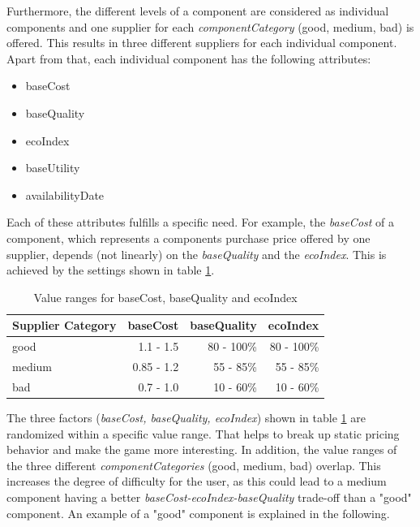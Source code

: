 Furthermore, the different levels of a component are considered as individual components and one supplier for each \textit{componentCategory} (good, medium, bad) is offered. This results in three different suppliers for each individual component.\\
Apart from that, each individual component has the following attributes:
\begin{itemize}
    \item baseCost
    \item baseQuality
    \item ecoIndex
    \item baseUtility
    \item availabilityDate
\end{itemize}
Each of these attributes fulfills a specific need. For example, the \textit{baseCost} of a component, which represents a components purchase price offered by one supplier, depends (not linearly) on the \textit{baseQuality} and the \textit{ecoIndex}. This is achieved by the settings shown in table \ref{component_price_calculation}.
    \begin{table}[ht]
    \centering
    \begin{tabular}{|l|r|r|r|}
    \hline
    Supplier Category & baseCost & baseQuality & ecoIndex \\
    \hline
    good & 1.1 - 1.5 & 80 - 100\% & 80 - 100\% \\
    medium & 0.85 - 1.2 & 55 - 85\% & 55 - 85\%\\
    bad  & 0.7 - 1.0 & 10 - 60\% & 10 - 60\%\\
    \hline
    \end{tabular}
    \caption{Value ranges for baseCost, baseQuality and ecoIndex}
    \label{component_price_calculation}
    \end{table}
\newline

The three factors (\textit{baseCost, baseQuality, ecoIndex}) shown in table \ref{component_price_calculation} are randomized within a specific value range. That helps to break up static pricing behavior and make the game more interesting. In addition, the value ranges of the three different \textit{componentCategories} (good, medium, bad) overlap. This increases the degree of difficulty for the user, as this could lead to a medium component having a better \textit{baseCost-ecoIndex-baseQuality} trade-off than a "good" component. An example of a "good" component is explained in the following.


